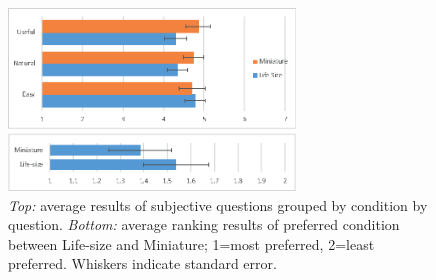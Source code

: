 \begin{figure}[ht]
    \centering
    \includegraphics[width=3in]{images/images-09.eps}
    \caption{\textit{Top:} average results of subjective questions grouped by condition by question. \textit{Bottom:} average ranking results of preferred condition between Life-size and Miniature; 1=most preferred, 2=least preferred. Whiskers indicate standard error.}
    \label{fig:continuum:results}
\end{figure}